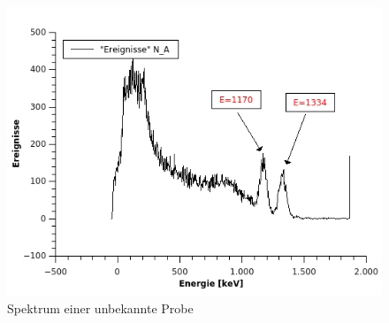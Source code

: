 \documentclass[12pt,a4paper]{article}
\begin{document}
\begin{figure}[H]
	\centering
	\includegraphics[scale=3.0]{./figures/UnbekannteProbeSpektrum.png}
	\caption{Spektrum einer unbekannte Probe}
	\label{fig:ausw_gammabetta_unbekannt}
\end{figure}
\end{document}
